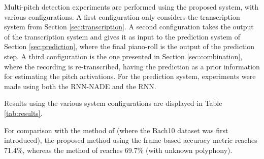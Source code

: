 Multi-pitch detection experiments are performed using the proposed system, with various configurations. A first configuration only considers the transcription system from Section \ref{sec:transcription}. A second configuration takes the output of the transcription system and gives it as input to the prediction system of Section \ref{sec:prediction}, where the final piano-roll is the output of the prediction step. A third configuration is the one presented in Section \ref{sec:combination}, where the recording is re-transcribed, having the prediction as a prior information for estimating the pitch activations. For the prediction system, experiments were made using both the RNN-NADE and the RNN.

Results using the various system configurations are displayed in Table \ref{tab:results}.

For comparison with the method of \cite{Duan10} (where the Bach10 dataset was first introduced), the proposed method using the frame-based accuracy metric reaches 71.4\%, whereas the method of \cite{Duan10} reaches 69.7\% (with unknown polyphony). 

\begin{table}[t]
 \begin{center}
\end{center}
 \caption{Transcription results using various system configurations.}
 \label{tab:results}
\end{table}
